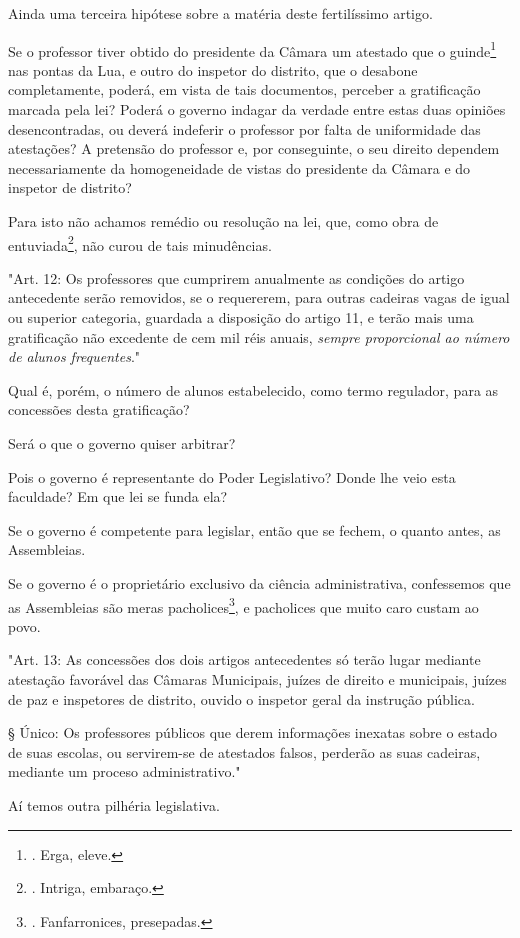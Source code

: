 Ainda uma terceira hipótese sobre a matéria deste fertilíssimo artigo.

Se o professor tiver obtido do presidente da Câmara um atestado que o
guinde\footnote{. Erga, eleve.} nas pontas da Lua, e outro do inspetor
do distrito, que o desabone completamente, poderá, em vista de tais
documentos, perceber a gratificação marcada pela lei? Poderá o governo
indagar da verdade entre estas duas opiniões desencontradas, ou deverá
indeferir o professor por falta de uniformidade das atestações? A
pretensão do professor e, por conseguinte, o seu direito dependem
necessariamente da homogeneidade de vistas do presidente da Câmara e do
inspetor de distrito?

Para isto não achamos remédio ou resolução na lei, que, como obra de
entuviada\footnote{. Intriga, embaraço.}, não curou de tais minudências.

"Art. 12: Os professores que cumprirem anualmente as condições do artigo
antecedente serão removidos, se o requererem, para outras cadeiras vagas
de igual ou superior categoria, guardada a disposição do artigo 11, e
terão mais uma gratificação não excedente de cem mil réis anuais,
\emph{sempre proporcional ao número de alunos frequentes}."

Qual é, porém, o número de alunos estabelecido, como termo regulador,
para as concessões desta gratificação?

Será o que o governo quiser arbitrar?

Pois o governo é representante do Poder Legislativo? Donde lhe veio esta
faculdade? Em que lei se funda ela?

Se o governo é competente para legislar, então que se fechem, o quanto
antes, as Assembleias.

Se o governo é o proprietário exclusivo da ciência administrativa,
confessemos que as Assembleias são meras pacholices\footnote{.
  Fanfarronices, presepadas.}, e pacholices que muito caro custam ao
povo.

"Art. 13: As concessões dos dois artigos antecedentes só terão lugar
mediante atestação favorável das Câmaras Municipais, juízes de direito e
municipais, juízes de paz e inspetores de distrito, ouvido o inspetor
geral da instrução pública.

§ Único: Os professores públicos que derem informações inexatas sobre o
estado de suas escolas, ou servirem-se de atestados falsos, perderão as
suas cadeiras, mediante um proceso administrativo."

Aí temos outra pilhéria legislativa.

